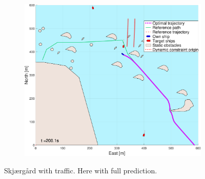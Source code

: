 \begin{figure}[ht]
\begin{subfigure}[b]{0.494\textwidth}
        \subcaption{}
    \end{subfigure}
    \hfill
    \begin{subfigure}[b]{0.494\textwidth}
        \centering
        \includegraphics[width=\textwidth]{Images/NewFigures/skjergard_m_trafikk_NEW/_Simple_0fig999_time=201}
        \subcaption{}
    \end{subfigure}
    \hfill
    \caption{Skjærgård with traffic. Here with full prediction.}
\end{figure}
